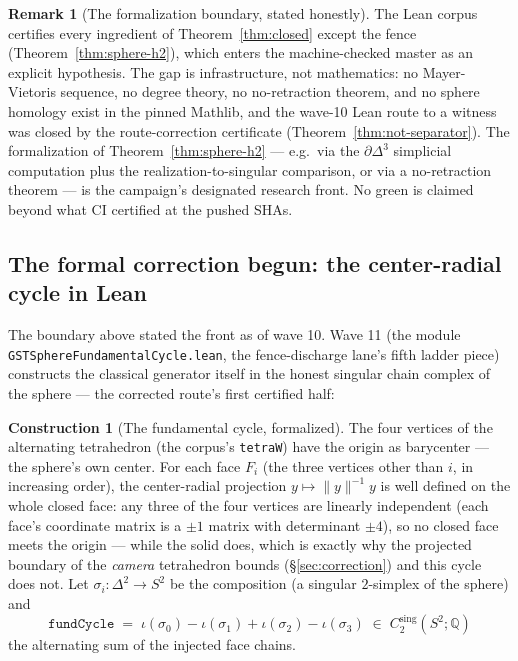 \documentclass[11pt,a4paper]{article}
\theoremstyle{plain}
\theoremstyle{definition}
\newtheorem{construction}[theorem]{Construction}
\newtheorem{remark}[theorem]{Remark}
\newcommand{\Q}{\mathbb{Q}}
\begin{document}
\begin{remark}[The formalization boundary, stated honestly]
The Lean corpus certifies every ingredient of
Theorem~\ref{thm:closed} except the fence
(Theorem~\ref{thm:sphere-h2}), which enters the machine-checked
master as an explicit hypothesis.  The gap is infrastructure, not
mathematics: no Mayer-Vietoris sequence, no degree theory, no
no-retraction theorem, and no sphere homology exist in the pinned
Mathlib, and the wave-10 Lean route to a witness was closed by the
route-correction certificate
(Theorem~\ref{thm:not-separator}).  The formalization of
Theorem~\ref{thm:sphere-h2} --- e.g.\ via the $\partial\Delta^3$
simplicial computation plus the realization-to-singular comparison,
or via a no-retraction theorem --- is the campaign's designated
research front.  No green is claimed beyond what CI certified at the
pushed SHAs.
\end{remark}

\subsection{The formal correction begun: the center-radial cycle in
Lean}

The boundary above stated the front as of wave 10.  Wave 11 (the
module \texttt{GSTSphereFundamentalCycle.lean}, the fence-discharge
lane's fifth ladder piece) constructs the classical generator itself
in the honest singular chain complex of the sphere --- the corrected
route's first certified half:

\begin{construction}[The fundamental cycle, formalized]
\label{con:fund-cycle-lean}
The four vertices of the alternating tetrahedron (the corpus's
\texttt{tetraW}) have the origin as barycenter --- the sphere's own
center.  For each face $F_i$ (the three vertices other than $i$, in
increasing order), the center-radial projection $y \mapsto
\|y\|^{-1} y$ is well defined on the whole closed face: any three of
the four vertices are linearly independent (each face's coordinate
matrix is a $\pm 1$ matrix with determinant $\pm 4$), so no closed
face meets the origin --- while the solid does, which is exactly why
the projected boundary of the \emph{camera} tetrahedron bounds
(\S\ref{sec:correction}) and this cycle does not.  Let $\sigma_i :
\Delta^2 \to S^2$ be the composition (a singular $2$-simplex of the
sphere) and
\[
\texttt{fundCycle} \;=\; \iota(\sigma_0) - \iota(\sigma_1) +
  \iota(\sigma_2) - \iota(\sigma_3) \;\in\;
  C_2^{\mathrm{sing}}(S^2;\Q)
\]
the alternating sum of the injected face chains.
\end{construction}
\end{document}
